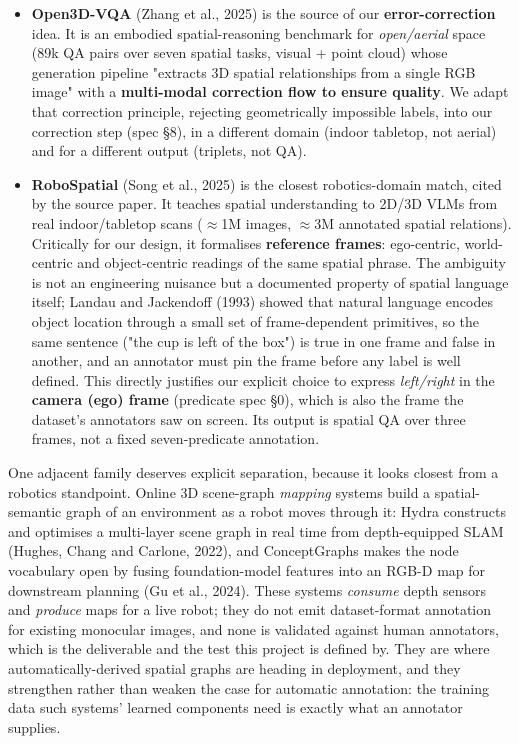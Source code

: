 \begin{itemize}
\item \textbf{Open3D-VQA} (Zhang et al., 2025) is the source of our \textbf{error-correction}
idea. It is an embodied spatial-reasoning benchmark for \textit{open/aerial} space (89k QA pairs over seven spatial tasks, visual + point cloud) whose generation pipeline "extracts 3D spatial relationships from a single RGB image" with a \textbf{multi-modal correction flow to ensure quality}. We adapt that correction principle, rejecting geometrically impossible labels, into our correction step (spec \S8), in a different domain (indoor tabletop, not aerial) and for a different output (triplets, not QA).
\end{itemize}

\begin{itemize}
\item \textbf{RoboSpatial} (Song et al., 2025) is the closest robotics-domain
match, cited by the source paper. It teaches spatial understanding to 2D/3D VLMs from real indoor/tabletop scans ($\approx$1M images, $\approx$3M annotated spatial relations). Critically for our design, it formalises \textbf{reference frames}: ego-centric, world-centric and object-centric readings of the same spatial phrase. The ambiguity is not an engineering nuisance but a documented property of spatial language itself; Landau and Jackendoff (1993) showed that natural language encodes object location through a small set of frame-dependent primitives, so the same sentence ("the cup is left of the box") is true in one frame and false in another, and an annotator must pin the frame before any label is well defined. This directly justifies our explicit choice to express \textit{left/right} in the \textbf{camera (ego) frame} (predicate spec \S0), which is also the frame the dataset's annotators saw on screen. Its output is spatial QA over three frames, not a fixed seven-predicate annotation.
\end{itemize}

One adjacent family deserves explicit separation, because it looks closest from a robotics standpoint. Online 3D scene-graph \textit{mapping} systems build a spatial-semantic graph of an environment as a robot moves through it: Hydra constructs and optimises a multi-layer scene graph in real time from depth-equipped SLAM (Hughes, Chang and Carlone, 2022), and ConceptGraphs makes the node vocabulary open by fusing foundation-model features into an RGB-D map for downstream planning (Gu et al., 2024). These systems \textit{consume} depth sensors and \textit{produce} maps for a live robot; they do not emit dataset-format annotation for existing monocular images, and none is validated against human annotators, which is the deliverable and the test this project is defined by. They are where automatically-derived spatial graphs are heading in deployment, and they strengthen rather than weaken the case for automatic annotation: the training data such systems' learned components need is exactly what an annotator supplies.


